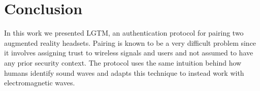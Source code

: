 \documentclass[12pt]{report}
\begin{document}
\section{Conclusion}
In this work we presented LGTM, an authentication protocol for pairing two augmented reality headsets. Pairing is known to be a very difficult problem since it involves assigning trust to wireless signals and users and not assumed to have any prior security context. The protocol uses the same intuition behind how humans identify sound waves and adapts this technique to instead work with electromagnetic waves. \par


%
%

%






%


\end{document}
